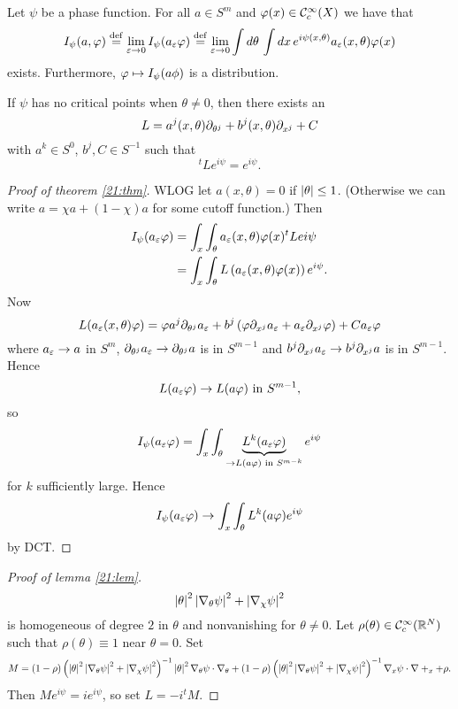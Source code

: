 \begin{thm}\label{21:thm}
  Let $\psi$ be a phase function.
  For all $a\in S^m$ and $\varphi(x)\in\mathcal{C}_c^\infty(X)$ we have that
  \[ I_\psi(a,\varphi) \overset{\mathrm{def}}{=} \lim_{\varepsilon\to0} I_\psi(a_\varepsilon\varphi) \overset{\mathrm{def}}{=} \lim_{\varepsilon\to0} \int d\theta\, \int dx\,  e^{i\psi(x,\theta)} a_\varepsilon(x,\theta) \varphi(x) \]
  exists.
  Furthermore, $\varphi\mapsto I_\psi(a\phi)$ is a distribution.
\end{thm}

\begin{lem}\label{21:lem}
  If $\psi$ has no critical points when $\theta\neq0$, then there exists an
  \[ L = a^j(x,\theta)\partial_{\theta^j} + b^j(x,\theta)\partial_{x^j} + C \]
  with $a^k\in S^0$, $b^j,C\in S^{-1}$ such that
  \[ {}^tLe^{i\psi}=e^{i\psi}. \]
\end{lem}

\begin{proof}[Proof of theorem \ref{21:thm}]
  WLOG let $a(x,\theta)=0$ if $\left\lvert \theta \right\rvert\leq1$.
  (Otherwise we can write $a=\chi a+(1-\chi)a$ for some cutoff function.)
  Then
  \begin{align*}
    I_\psi(a_\varepsilon\varphi) &= \int_x \int_\theta a_\varepsilon(x,\theta) \varphi(x) {}^tLe{i\psi} \\
    &= \int_x \int_\theta L\left( a_\varepsilon(x,\theta)\varphi(x) \right) e^{i\psi}.
  \end{align*}
  Now
  \[ L(a_\varepsilon(x,\theta)\varphi) = \varphi a^j\partial_{\theta^j}a_\varepsilon + b^j\left( \varphi\partial_{x^j}a_\varepsilon + a_\varepsilon\partial_{x^j}\varphi \right) + C a_\varepsilon\varphi \]
  where $a_\varepsilon\to a$ in $S^m$, $\partial_{\theta^j}a_\varepsilon\to\partial_{\theta^j}a$ is in $S^{m-1}$ and $b^j\partial_{x^j}a_\varepsilon\to b^j\partial_{x^j}a$ is in $S^{m-1}$.
  Hence
  \[ L(a_\varepsilon\varphi) \to L(a\varphi) \text{ in } S^{m-1}, \]
  so
  \[ I_\psi(a_\varepsilon\varphi) = \int_x \int_\theta \underbrace{L^k(a_\varepsilon\varphi)}_{\to L(a\varphi) \text{ in } S^{m-k}}e^{i\psi} \]
  for $k$ sufficiently large.
  Hence
  \[ I_\psi(a_\varepsilon\varphi) \to \int_x\int_\theta L^k(a\varphi)e^{i\psi} \]
  by DCT.
\end{proof}

\begin{proof}[Proof of lemma \ref{21:lem}]
  \[ \left\lvert \theta \right\rvert^2\left\lvert \nabla_\theta\psi \right\rvert^2+\left\lvert \nabla_\chi\psi \right\rvert^2 \]
  is homogeneous of degree $2$ in $\theta$ and nonvanishing for $\theta\neq0$.
  Let $\rho(\theta)\in\mathcal{C}_c^\infty(\mathbb{R}^N)$ such that $\rho(\theta)\equiv1$ near $\theta=0$.
  Set
  \[ M=(1-\rho)\left( \left\lvert \theta \right\rvert^2\left\lvert \nabla_\theta\psi \right\rvert^2+\left\lvert \nabla_\chi\psi \right\rvert^2 \right)^{-1}\left\lvert \theta \right\rvert^2\nabla_\theta\psi\cdot\nabla_\theta + (1-\rho)\left( \left\lvert \theta \right\rvert^2\left\lvert \nabla_\theta\psi \right\rvert^2+\left\lvert \nabla_\chi\psi \right\rvert^2 \right)^{-1}\nabla_x\psi\cdot\nabla+_x + \rho. \]
  Then $Me^{i\psi}=ie^{i\psi}$, so set $L=-i{}^tM$.
\end{proof}

